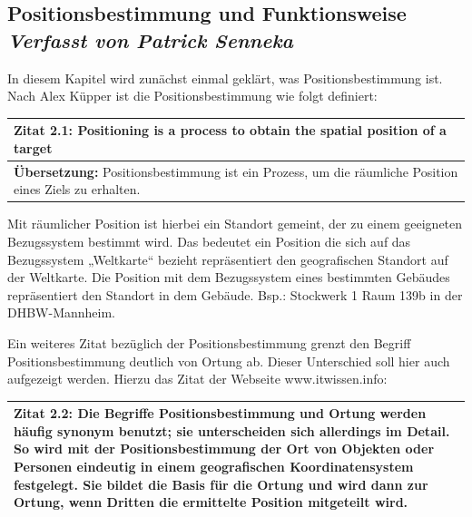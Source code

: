 \newpage
\subsection[Positionsbestimmung und Funktionsweise]{Positionsbestimmung und Funktionsweise
 \\ \textnormal{\small{\textit {Verfasst von Patrick Senneka}}}}


In diesem Kapitel wird zunächst einmal geklärt, was Positionsbestimmung ist. 
Nach Alex Küpper ist die Positionsbestimmung wie folgt definiert:

\begin{table}[h]
	\centering
	\begin{tabular}{|p{16cm}|}\hline
		\textbf{Zitat 2.1:} \glqq Positioning is a process to obtain the spatial position of a target \grqq  \cite[S.121]{Kuepper2005} \\ \hline
		\textbf{Übersetzung:} Positionsbestimmung ist ein Prozess, um die räumliche Position eines Ziels zu erhalten. \\ \hline
	\end{tabular}
\end{table}

Mit räumlicher Position ist hierbei ein Standort gemeint, der zu einem geeigneten Bezugssystem bestimmt wird. Das bedeutet ein Position die sich auf das Bezugssystem „Weltkarte“ bezieht repräsentiert den geografischen Standort auf der Weltkarte. Die Position mit dem Bezugssystem eines bestimmten Gebäudes repräsentiert den Standort in dem Gebäude. Bsp.: Stockwerk 1 Raum 139b in der DHBW-Mannheim.

Ein weiteres Zitat bezüglich der Positionsbestimmung grenzt den Begriff Positionsbestimmung deutlich von Ortung ab. Dieser Unterschied soll hier auch aufgezeigt werden. Hierzu das Zitat der Webseite www.itwissen.info:

\begin{table}[h]
	\centering
	\begin{tabular}{|p{16cm}|}\hline
		\textbf{Zitat 2.2:} \glqq Die Begriffe Positionsbestimmung und Ortung werden häufig synonym benutzt; sie unterscheiden sich allerdings im Detail. So wird mit der Positionsbestimmung der Ort von Objekten oder Personen eindeutig in einem geografischen Koordinatensystem festgelegt. Sie bildet die Basis für die Ortung und wird dann zur Ortung, wenn Dritten die ermittelte Position mitgeteilt wird. \grqq  \cite[Positionsbestimmung]{itwissen} \\ \hline
	\end{tabular}
\end{table}

